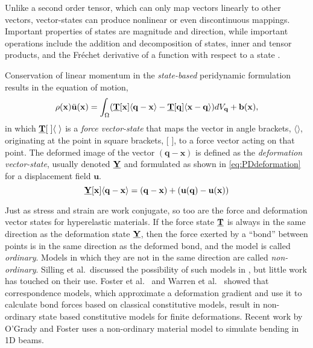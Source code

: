 \documentclass[preprint,review,12pt]{elsarticle}
\newcommand\vstate[3]{%
	\mathbf{\underline{#1}}%
	\ifstrempty{#2}{}{[#2]}%
	\ifstrempty{#3}{}{\langle #3 \rangle}}
\begin{document}
Unlike a second order tensor, which can only map vectors linearly to other vectors, vector-states can produce nonlinear or even discontinuous mappings.  Important properties of states are magnitude and direction, while important operations include the addition and decomposition of states, inner and tensor products, and the Fr\'{e}chet derivative of a function with respect to a state \cite{silling2007peridynamic}.

Conservation of linear momentum in the \textit{state-based} peridynamic formulation results in the equation of motion,
%
\begin{equation}
    \label{eq:PDstateEoM}
    \rho(\mathbf{x})\ddot{\mathbf{u}}(\mathbf{x}) = \int_\Omega (\vstate{T}{\mathbf{x}}{\mathbf{q}-\mathbf{x}}-\vstate{T}{\mathbf{q}}{\mathbf{x}-\mathbf{q}}) dV_\mathbf{q}  + \mathbf{b}(\mathbf{x}),
\end{equation}
%
in which $\vstate{T}{\;}{\;}$ is a \textit{force vector-state} that maps the vector in angle brackets, $\langle \rangle$, originating at the point in square brackets, [ ], to a force vector acting on that point.
The deformed image of the vector $(\mathbf{q-x})$ is defined as the \textit{deformation vector-state}, usually denoted $\vstate{Y}{}{}$ and formulated as shown in \cref{eq:PDdeformation} for a displacement field \(\mathbf{u}\). 
%
\begin{equation}
    \label{eq:PDdeformation}
    \vstate{Y}{\mathbf{x}}{\mathbf{q}-\mathbf{x}} = (\mathbf{q}-\mathbf{x}) + (\mathbf{u}(\mathbf{q})-\mathbf{u}(\mathbf{x}))
\end{equation}
%

Just as stress and strain are work conjugate, so too are the force and deformation vector states for hyperelastic materials.  If the force state $\vstate{T}{}{}$ is always in the same direction as the deformation state $\vstate{Y}{}{}$, then the force exerted by a ``bond'' between points is in the same direction as the deformed bond, and the model is called \textit{ordinary}.  Models in which they are not in the same direction are called \textit{non-ordinary}.  Silling et al.\ discussed the possibility of such models in \cite{silling2010peridynamic}, but little work has touched on their use.  Foster et al.\ \cite{foster2010viscoplasticity} and Warren et al.\ \cite{warren2009non} showed that correspondence models, which approximate a deformation gradient and use it to calculate bond forces based on classical constitutive models, result in non-ordinary state based constitutive models for finite deformations. Recent work by O'Grady and Foster \cite{ogrady2014beams} uses a non-ordinary material model to simulate bending in 1D beams.
%
\end{document}

